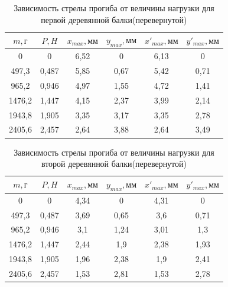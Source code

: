\documentclass[a4paper,12pt]{article} %
\begin{document}
\begin{table}[!h]
\centering
\begin{tabular}{|c|c|c|c|c|c|}
\hline
$m, \text{г}$   & $P,  H$    & $x_{max}, \text{мм}$ &  $y_{max}, \text{мм}$    & $x'_{max}, \text{мм}$ &    $y'_{max}, \text{мм}$  \\ \hline
0      & 0      & 6,52 & 0    & 6,13 & 0    \\ \hline
497,3  & 0,487  & 5,85 & 0,67 & 5,42 & 0,71 \\ \hline
965,2  & 0,946  & 4,97 & 1,55 & 4,72 & 1,41 \\ \hline
1476,2 & 1,447 & 4,15 & 2,37 & 3,99 & 2,14 \\ \hline
1943,8 & 1,905 & 3,35 & 3,17 & 3,35 & 2,78 \\ \hline
2405,6 & 2,457 & 2,64 & 3,88 & 2,64 & 3,49 \\ \hline
\end{tabular}
\caption{Зависимость стрелы прогиба от величины нагрузки для первой деревянной балки(перевернутой)}
\end{table}
\newpage
\begin{table}[h]
\centering
\begin{tabular}{|c|c|c|c|c|c|}
\hline
$m, \text{г}$   & $P,  H$    & $x_{max}, \text{мм}$ &  $y_{max}, \text{мм}$    & $x'_{max}, \text{мм}$ &    $y'_{max}, \text{мм}$  \\ \hline
0      & 0      & 4,34 & 0    & 4,31 & 0    \\ \hline
497,3  & 0,487  & 3,69 & 0,65 & 3,6  & 0,71 \\ \hline
965,2  & 0,946  & 3,1  & 1,24 & 3,01 & 1,3  \\ \hline
1476,2 & 1,447 & 2,44 & 1,9  & 2,38 & 1,93 \\ \hline
1943,8 & 1,905 & 1,96 & 2,38 & 1,9  & 2,41 \\ \hline
2405,6 & 2,457 & 1,53 & 2,81 & 1,53 & 2,78 \\ \hline
\end{tabular}
\caption{Зависимость стрелы прогиба от величины нагрузки для второй деревянной балки(перевернутой)}
\end{table}
\end{document}
